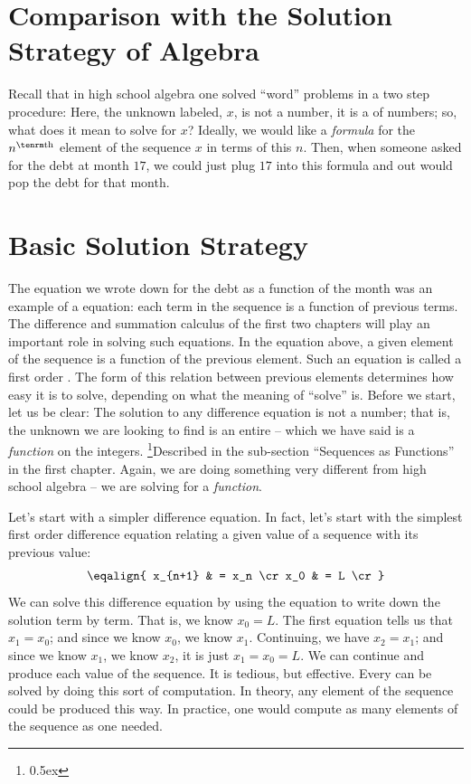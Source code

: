 \section{Comparison with the Solution Strategy of Algebra}
Recall that in high school algebra one solved ``word'' problems in a two step procedure:
\beginEnum
\endEnum
Here, the unknown labeled, $x$, is not a number, it is 
a {\it {}\/} of numbers; so, what does it mean to solve for $x$?
Ideally, we would like a {\it formula\/} for the $n^{\rm th}$ element of 
the sequence $x$ in terms of this $n$. Then, when 
someone asked for the debt at month $17$, we could just plug $17$ 
into this formula and out would pop the debt for that month.

\section{Basic Solution Strategy}
The equation we wrote down for the debt as a function of the month 
was an example of a {\it {}} equation: each term in the sequence is a function of previous 
terms. The difference and summation calculus of the 
first two chapters
will play an important role in solving such equations. 
In the equation above, a given element of the sequence is a function of the previous element.
Such an equation is called a first order {\it {}}.
The form of this relation between previous elements 
determines how easy it is to solve, depending 
on what the meaning of 
``solve'' is. Before we start, let us be clear: The solution to any difference 
equation is not a number; that is, the unknown we are looking to 
find is an entire {\it {}\/} -- which we have said is a {\it function\/} on the integers.%
\footnote{\kern 0.5pt \raise 0.5ex \hbox{\dag}}{Described in the sub-section ``Sequences as Functions'' in the first chapter.}
Again, we are doing something very different from high school algebra -- we are solving for a {\it function\/}.

Let's start with a simpler difference equation. In fact, let's start with 
the simplest first order difference equation relating a given value of 
a sequence with its previous value:
$$
\eqalign{
x_{n+1} & = x_n \cr
x_0 & = L \cr
}
$$
We can solve this difference equation by using the equation to write 
down the solution term by term. That is, we know $x_0 = L$. 
The first equation tells us that $x_1 = x_0$; and since we know $x_0$, we 
know $x_1$. Continuing, we have $x_2 = x_1$; and since we know $x_1$, 
we know $x_2$, it is just $x_1 = x_0 = L$. We can continue and produce 
each value of the sequence. It is tedious, but effective. Every  can be solved by doing this sort of computation. In theory, any 
element of the sequence could be produced this way. In practice, one 
would compute as many elements of the sequence as one needed.

